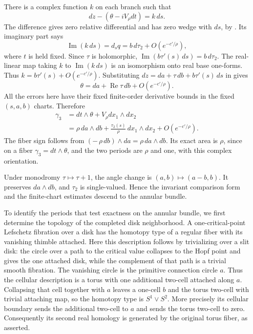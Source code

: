 There is a complex function \(k\) on each branch such that
\begin{equation}\label{eq:nodal-connection-comparison}
 dz-(\theta-iV_\rho dt)=k\,ds.
\end{equation}
The difference gives zero relative differential and has zero
wedge with \(ds\), by .
Its imaginary part says
\[
 \operatorname{Im}(k\,ds)=d_s q
       =b\,d\tau_2+O(e^{-c'/\rho}),
\]
where \(t\) is held fixed.  Since \(\tau\) is holomorphic,
\(\operatorname{Im}(b\tau'(s)\,ds)=b\,d\tau_2\).
The real-linear map taking \(k\) to \(\operatorname{Im}(k\,ds)\)
is an isomorphism onto real base one-forms.  Thus
\(k=b\tau'(s)+O(e^{-c'/\rho})\).
Substituting \(dz=da+\tau\,db+b\tau'(s)\,ds\) in
 gives
\begin{equation}\label{eq:nodal-theta-tail}
 \theta=da+\operatorname{Re}\tau\,db+O(e^{-c'/\rho}).
\end{equation}
All the errors here have their fixed finite-order derivative
bounds in the fixed \((s,a,b)\) charts.  Therefore
\begin{equation}\label{eq:nodal-area-one-comparison}
 \begin{split}
 \gamma_3&=dt\wedge\theta+V_\rho dx_1\wedge dx_2\\
 &=\rho\,da\wedge db+
       \frac{\tau_2(s)}{\rho}\,dx_1\wedge dx_2
            +O(e^{-c'/\rho}).
 \end{split}
\end{equation}
The fiber sign follows from
\((-\,\rho\,db)\wedge da=\rho\,da\wedge db\).
Its exact area is \(\rho\), since on a fiber
\(\gamma_3=dt\wedge\theta\), and the two periods are \(\rho\)
and one, with this complex orientation.

Under monodromy \(\tau\mapsto\tau+1\), the angle change is
\((a,b)\mapsto(a-b,b)\).  It preserves \(da\wedge db\), and
\(\tau_2\) is single-valued.  Hence the invariant comparison
form and the finite-chart estimates descend to the annular bundle.

To identify the periods that test exactness on the annular bundle,
we first determine the topology of the completed disk neighborhood.
A one-critical-point Lefschetz fibration over a disk has the
homotopy type of a regular fiber with its vanishing thimble attached.
Here this description follows by trivializing over a slit disk:
the circle over a path to the critical value collapses to the Hopf
point and gives the one attached disk, while the complement of
that path is a trivial smooth fibration.  The vanishing circle is
the primitive connection circle \(a\).
Thus the cellular description is a torus with one additional
two-cell attached along \(a\).  Collapsing that cell together
with \(a\) leaves a one-cell \(b\) and the torus two-cell with
trivial attaching map, so the homotopy type is \(S^1\vee S^2\).
More precisely its cellular boundary sends the additional
two-cell to \(a\) and sends the torus two-cell to zero.
Consequently its second real homology is generated by the
original torus fiber, as asserted.

